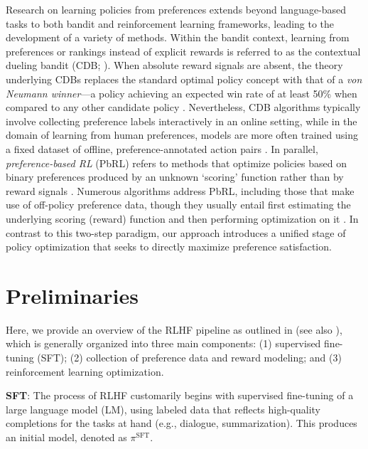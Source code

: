 Research on learning policies from preferences extends beyond language-based tasks to both bandit and reinforcement learning frameworks, leading to the development of a variety of methods. Within the bandit context, learning from preferences or rankings instead of explicit rewards is referred to as the contextual dueling bandit (CDB; \cite{yue2012karmed,dudik2015contextual}). When absolute reward signals are absent, the theory underlying CDBs replaces the standard optimal policy concept with that of a \textit{von Neumann winner}—a policy achieving an expected win rate of at least 50\% when compared to any other candidate policy \citep{dudik2015contextual}. Nevertheless, CDB algorithms typically involve collecting preference labels interactively in an online setting, while in the domain of learning from human preferences, models are more often trained using a fixed dataset of offline, preference-annotated action pairs \citep{yan2022human}. In parallel, \textit{preference-based RL} (PbRL) refers to methods that optimize policies based on binary preferences produced by an unknown ‘scoring’ function rather than by reward signals \citep{BusaFekete2014,ruiz2023dueling}. Numerous algorithms address PbRL, including those that make use of off-policy preference data, though they usually entail first estimating the underlying scoring (reward) function and then performing optimization on it \citep{jain2013learning,BusaFekete2014,christiano2017deep,sadigh2017active,kupcsik2018learning}. In contrast to this two-step paradigm, our approach introduces a unified stage of policy optimization that seeks to directly maximize preference satisfaction.

\section{Preliminaries}\label{section:prelims}

Here, we provide an overview of the RLHF pipeline as outlined in \citeauthor{ziegler2020finetuning} (see also \citep{stiennon2022learning, bai2022training, ouyang2022training}), which is generally organized into three main components: (1) supervised fine-tuning (SFT); (2) collection of preference data and reward modeling; and (3) reinforcement learning optimization.

\textbf{SFT}: The process of RLHF customarily begins with supervised fine-tuning of a large language model (LM), using labeled data that reflects high-quality completions for the tasks at hand (e.g., dialogue, summarization). This produces an initial model, denoted as $\pi^\text{SFT}$.

